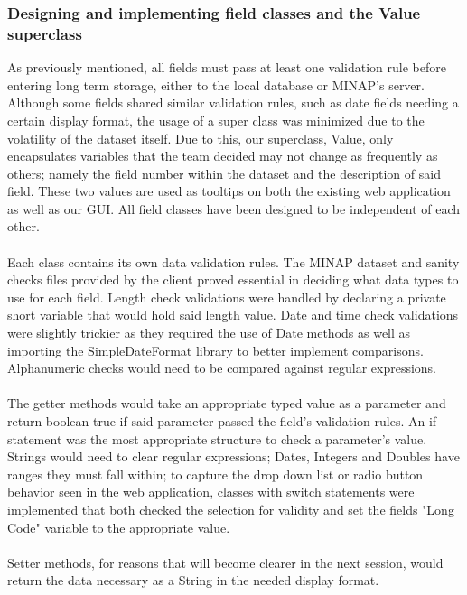 \documentclass[12pt,a4paper,oneside,titlepage]{article}
\begin{document}
\subsubsection{Designing and implementing field classes and the Value superclass}
As previously mentioned, all fields must pass at least one validation rule before entering long term storage, either to the local database or MINAP's server. Although some fields shared similar validation rules, such as date fields needing a certain display format, the usage of a super class was minimized due to the volatility of the dataset itself. Due to this, our superclass, Value, only encapsulates variables that the team decided may not change as frequently as others; namely the field number within the dataset and the description of said field. These two values are used as tooltips on both the existing web application as well as our GUI. All field classes have been designed to be independent of each other.
\\ \\
Each class contains its own data validation rules. The MINAP dataset and sanity checks files provided by the client proved essential in deciding what data types to use for each field. Length check validations were handled by declaring a private short variable that would hold said length value. Date and time check validations were slightly trickier as they required the use of Date methods as well as importing the SimpleDateFormat library to better implement comparisons. Alphanumeric checks would need to be compared against regular expressions.
\\ \\
The getter methods would take an appropriate typed value as a parameter and return boolean true if said parameter passed the field's validation rules. An if statement was the most appropriate structure to check a parameter's value. Strings would need to clear regular expressions; Dates, Integers and Doubles have ranges they must fall within; to capture the drop down list or radio button behavior seen in the web application, classes with switch statements were implemented that both checked the selection for validity and set the fields "Long Code" variable to the appropriate value.
\\ \\
Setter methods, for reasons that will become clearer in the next session, would return the data necessary as a String in the needed display format.
\end{document}
